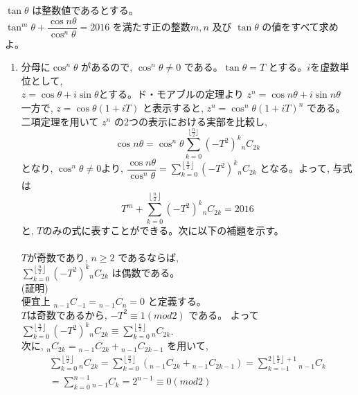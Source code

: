 $\tan{\theta}$ は整数値であるとする。\\
$\tan^m{\theta}+\dfrac{\cos{n\theta}}{\cos^n{\theta}}=2016$ を満たす正の整数$m,n$ 及び $\tan{\theta}$ の値をすべて求めよ。
\enthm
\begin{enumerate}
\item[]
分母に$\cos^n{\theta}$ があるので, $\cos^n{\theta}\neq 0$ である。$\tan{\theta}=T$ とする。$i$を虚数単位として,\\
$z=\cos{\theta}+i\sin{\theta}$とする。ド・モアブルの定理より $z^n=\cos{n\theta}+i\sin{n\theta}$\\
一方で, $z=\cos{\theta}\left(1+iT\right)$ と表示すると, $z^n=\cos^n{\theta}\left(1+iT \right)^n $ である。\\
二項定理を用いて $z^n$ の2つの表示における実部を比較し,
\[\cos{n\theta}=\cos^n{\theta}\displaystyle\sum_{k=0}^{\lfloor\frac{n}{2}\rfloor} (-T^2)^k{}_nC_{2k}\]
となり, $\cos^n{\theta}\neq 0$より, $\dfrac{\cos{n\theta}}{\cos^n{\theta}} = \displaystyle\sum_{k=0}^{\left\lfloor\frac{n}{2}\right\rfloor} (-T^2)^k{}_nC_{2k}$ となる。よって, 与式は
\[T^m+\displaystyle\sum_{k=0}^{\left\lfloor\frac{n}{2}\right\rfloor} (-T^2)^k{}_nC_{2k}=2016\] と, $T$のみの式に表すことができる。次に以下の補題を示す。\\
\\
 $T$が奇数であり, $n\ge 2$ であるならば, \\
$\displaystyle\sum_{k=0}^{\left\lfloor\frac{n}{2}\right\rfloor} (-T^2)^k{}_nC_{2k}$ は偶数である。
\enthm
\\
(証明)\\
便宜上 ${}_{n-1}C_{-1}={}_{n-1}C_{n}=0$ と定義する。\\
$T$は奇数であるから, $-T^2\equiv 1 (mod 2)$ である。 よって $\displaystyle\sum_{k=0}^{\left\lfloor\frac{n}{2}\right\rfloor} (-T^2)^k{}_nC_{2k}\equiv \displaystyle\sum_{k=0}^{\left\lfloor\frac{n}{2}\right\rfloor} {}_nC_{2k}$.\\
次に, ${}_nC_{2k} ={}_{n-1}C_{2k}+{}_{n-1}C_{2k-1}$ を用いて, 
\begin{eqnarray*}
 \displaystyle\sum_{k=0}^{\left\lfloor\frac{n}{2}\right\rfloor} {}_nC_{2k} =\displaystyle\sum_{k=0}^{\left\lfloor\frac{n}{2}\right\rfloor} ({}_{n-1}C_{2k}+{}_{n-1}C_{2k-1} )= \displaystyle\sum_{k=-1}^{2\left\lfloor\frac{n}{2} \right\rfloor +1} {}_{n-1}C_{k} \\
= \displaystyle\sum_{k=0}^{n-1} {}_{n-1}C_{k} =2^{n-1} \equiv 0 (mod 2)
\end{eqnarray*}

\end{enumerate}
